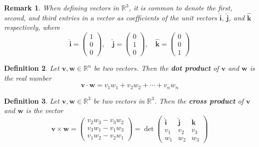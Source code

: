\documentclass[12pt]{book}
\newcommand{\rbb}{\mathbb{R}}
\theoremstyle{definitionstyle}
\newtheorem{definition}{Definition}[section]
\newtheorem{remark}[definition]{Remark}
\numberwithin{equation}{section}
\begin{document}
\vspace{0.5cm}

\begin{remark}
    When defining vectors in $\rbb^3$, it is common to denote the first, second, and third entries in a vector as coefficients of the unit vectors $\mathbf{\hat{i}}$, $\mathbf{\hat{j}}$, and $\mathbf{\hat{k}}$ respectively, where
    \begin{equation}
	\mathbf{\hat{i}} = \begin{pmatrix} 1 \\ 0 \\ 0 \end{pmatrix}, \quad \mathbf{\hat{j}} = \begin{pmatrix} 0 \\ 1 \\ 0 \end{pmatrix}, \quad \mathbf{\hat{k}} = \begin{pmatrix} 0 \\ 0 \\ 1 \end{pmatrix}
    \end{equation}
\end{remark}

\vspace{0.5cm}

\begin{definition}
    Let $\mathbf{v}, \mathbf{w} \in \rbb^n$ be two vectors. Then the \textbf{dot product} of $\mathbf{v}$ and $\mathbf{w}$ is the real number
    \begin{equation}
	\mathbf{v} \cdot \mathbf{w} = v_1 w_1 + v_2 w_2 + \cdots + v_n w_n
    \end{equation}

\end{definition}

\vspace{0.5cm}

\begin{definition}\label{cross-product}
    Let $\mathbf{v}, \mathbf{w} \in \rbb^3$ be two vectors in $\rbb^3$. Then the \textbf{cross product} of $\mathbf{v}$ and $\mathbf{w}$ is the vector
	\begin{equation}
	    \mathbf{v} \times \mathbf{w} = \begin{pmatrix} v_2 w_3 - v_3 w_2 \\ v_3 w_1 - v_1 w_3 \\ v_1 w_2 - v_2 w_1 \end{pmatrix} = \det\begin{pmatrix} \mathbf{\hat{i}} & \mathbf{\hat{j}} & \mathbf{\hat{k}} \\ v_1 & v_2 & v_3 \\ w_1 & w_2 & w_3 \end{pmatrix}
	\end{equation}
\end{definition}
\end{document}
